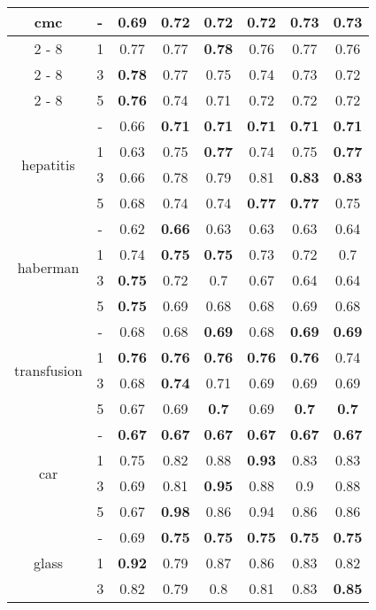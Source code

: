 \documentclass{article}%
\begin{document}
\begin{longtable}{c|c|cccccc}
\hline%
\multirow{4}{*}{cmc}&{-}&0.69&0.72&0.72&0.72&\textbf{0.73}&\textbf{0.73}\\%
\cline{2%
-%
8}%
&1&0.77&0.77&\textbf{0.78}&0.76&0.77&0.76\\%
\cline{2%
-%
8}%
&3&\textbf{0.78}&0.77&0.75&0.74&0.73&0.72\\%
\cline{2%
-%
8}%
&5&\textbf{0.76}&0.74&0.71&0.72&0.72&0.72\\%
\hline%
\multirow{4}{*}{hepatitis}&{-}&0.66&\textbf{0.71}&\textbf{0.71}&\textbf{0.71}&\textbf{0.71}&\textbf{0.71}\\%
\cline{2%
-%
8}%
&1&0.63&0.75&\textbf{0.77}&0.74&0.75&\textbf{0.77}\\%
\cline{2%
-%
8}%
&3&0.66&0.78&0.79&0.81&\textbf{0.83}&\textbf{0.83}\\%
\cline{2%
-%
8}%
&5&0.68&0.74&0.74&\textbf{0.77}&\textbf{0.77}&0.75\\%
\hline%
\multirow{4}{*}{haberman}&{-}&0.62&\textbf{0.66}&0.63&0.63&0.63&0.64\\%
\cline{2%
-%
8}%
&1&0.74&\textbf{0.75}&\textbf{0.75}&0.73&0.72&0.7\\%
\cline{2%
-%
8}%
&3&\textbf{0.75}&0.72&0.7&0.67&0.64&0.64\\%
\cline{2%
-%
8}%
&5&\textbf{0.75}&0.69&0.68&0.68&0.69&0.68\\%
\hline%
\multirow{4}{*}{transfusion}&{-}&0.68&0.68&\textbf{0.69}&0.68&\textbf{0.69}&\textbf{0.69}\\%
\cline{2%
-%
8}%
&1&\textbf{0.76}&\textbf{0.76}&\textbf{0.76}&\textbf{0.76}&\textbf{0.76}&0.74\\%
\cline{2%
-%
8}%
&3&0.68&\textbf{0.74}&0.71&0.69&0.69&0.69\\%
\cline{2%
-%
8}%
&5&0.67&0.69&\textbf{0.7}&0.69&\textbf{0.7}&\textbf{0.7}\\%
\hline%
\multirow{4}{*}{car}&{-}&\textbf{0.67}&\textbf{0.67}&\textbf{0.67}&\textbf{0.67}&\textbf{0.67}&\textbf{0.67}\\%
\cline{2%
-%
8}%
&1&0.75&0.82&0.88&\textbf{0.93}&0.83&0.83\\%
\cline{2%
-%
8}%
&3&0.69&0.81&\textbf{0.95}&0.88&0.9&0.88\\%
\cline{2%
-%
8}%
&5&0.67&\textbf{0.98}&0.86&0.94&0.86&0.86\\%
\hline%
\multirow{4}{*}{glass}&{-}&0.69&\textbf{0.75}&\textbf{0.75}&\textbf{0.75}&\textbf{0.75}&\textbf{0.75}\\%
\cline{2%
-%
8}%
&1&\textbf{0.92}&0.79&0.87&0.86&0.83&0.82\\%
\cline{2%
-%
8}%
&3&0.82&0.79&0.8&0.81&0.83&\textbf{0.85}\\%

\end{longtable}
\end{document}
